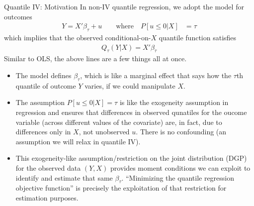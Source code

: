 \documentclass[aspectratio=169, handout]{beamer}
\begin{document}
{\scriptsize
\begin{frame}{Quantile IV: Motivation}
In non-IV quantile regression, we adopt the model for outcomes
\begin{align*}
  Y = X'\beta_\tau + u
  \qquad\text{where}\quad
  P[u \leq 0|X]&=\tau
\end{align*}
which impliies that the \alert{observed} conditional-on-$X$ quantile
function satisfies
\begin{align*}
  Q_\tau(Y|X)=X'\beta_\tau
\end{align*}
Similar to OLS, the above lines are a few things all at once.
\begin{itemize}
  \item The model defines $\beta_\tau$, which is like a
    \alert{marginal effect} that says how the $\tau$th quantile of
    outcome $Y$ varies, if we could manipulate $X$.

  \item The assumption $P[u \leq 0|X]=\tau$ is like the exogeneity
    assumption in regression and ensures that differences in observed
    qunatiles for the oucome variable (across different values of the
    covariate) are, in fact, due to differences only in $X$, not
    unobserved $u$.
    There is no confounding (an assumption we will relax in quantile
    IV).

  \item
    This exogeneity-like \alert{assumption}/\alert{restriction} on the
    joint distribution (DGP) for the observed data $(Y,X)$ provides
    moment conditions we can exploit to identify and estimate that same
    $\beta_\tau$.
    ``Minimizing the quantile regression objective function'' is
    precisely the exploitation of that restriction for estimation
    purposes.

\end{itemize}
\end{frame}
}
\end{document}
